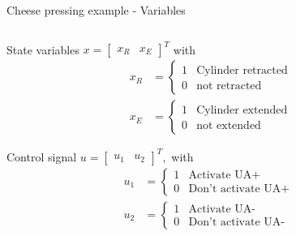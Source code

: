 \documentclass[presentation,aspectratio=1610]{beamer}
\begin{document}
\begin{frame}[label={sec:orgabc5f34}]{Cheese pressing example - Variables}
\begin{columns}
\begin{column}{0.5\columnwidth}
\begin{block}{State variables}
\(x = \begin{bmatrix} x_R & x_E \end{bmatrix}^T\) with
\begin{align*}
x_R &= \begin{cases} 1 & \text{Cylinder retracted}\\0 & \text{not retracted}\end{cases}\\
x_E &= \begin{cases} 1 & \text{Cylinder extended}\\0 & \text{not extended}\end{cases}
\end{align*}
\end{block}
\begin{block}{Control signal}
\(u = \begin{bmatrix} u_1 & u_2 \end{bmatrix}^T,\) with
\begin{align*}
u_1 &= \begin{cases} 1 & \text{Activate UA+}\\0 & \text{Don't activate UA+ }\end{cases}\\
u_2 &= \begin{cases} 1 & \text{Activate UA-}\\0 & \text{Don't activate UA-}\end{cases}
\end{align*}
\end{block}
\end{column}


\end{columns}
\end{frame}
\end{document}
